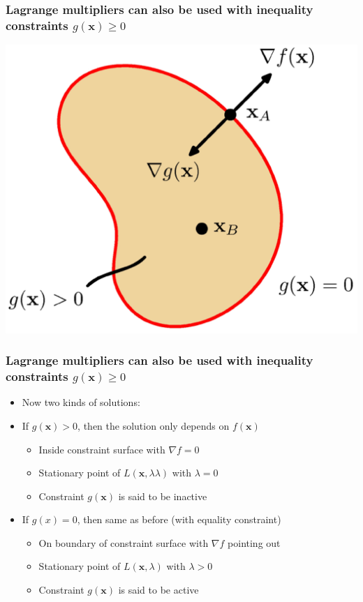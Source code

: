 \documentclass[12pt,notes,mathserif]{beamer}
\begin{document}
\begin{frame}[c]
\frametitle{Lagrange multipliers can also be used with inequality constraints $g(\bm{x})\geqslant{}0$}
\begin{center}
\includegraphics[width=0.65\linewidth]{fig8/lec832.jpg}
\end{center}
\end{frame}


\begin{frame}[c]
\frametitle{Lagrange multipliers can also be used with inequality constraints $g(\bm{x})\geqslant{}0$}
\begin{itemize}
\item Now two kinds of solutions:
\item If $g(\bm{x})> 0$, then the solution only depends on $f(\bm{x})$
\begin{itemize}
\item Inside constraint surface with $\nabla f= 0$
\item Stationary point of $L(\bm{x},𝜆\lambda)$ with $\lambda= 0$
\item Constraint $g(\bm{x})$ is said to be inactive
\end{itemize}
\item If $g(x)= 0$, then same as before (with equality constraint)
\begin{itemize}
\item On boundary of constraint surface with $\nabla f$ pointing out
\item Stationary point of $L(\bm{x},\lambda)$ with $\lambda> 0$
\item Constraint $g(\bm{x})$ is said to be active
\end{itemize}

\end{itemize}
\end{frame}
\end{document}
